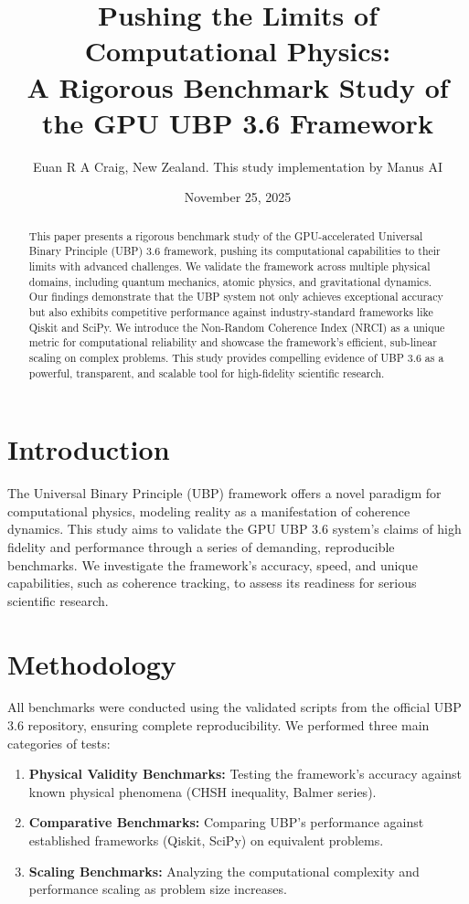 \documentclass[10pt, a4paper]{article}
\title{
    \textbf{Pushing the Limits of Computational Physics:}
    \\
    \large A Rigorous Benchmark Study of the GPU UBP 3.6 Framework
}
\author{Euan R A Craig, New Zealand. This study implementation by Manus AI}
\date{November 25, 2025}
\begin{document}
\maketitle

\begin{abstract}
This paper presents a rigorous benchmark study of the GPU-accelerated Universal Binary Principle (UBP) 3.6 framework, pushing its computational capabilities to their limits with advanced challenges. We validate the framework across multiple physical domains, including quantum mechanics, atomic physics, and gravitational dynamics. Our findings demonstrate that the UBP system not only achieves exceptional accuracy but also exhibits competitive performance against industry-standard frameworks like Qiskit and SciPy. We introduce the Non-Random Coherence Index (NRCI) as a unique metric for computational reliability and showcase the framework’s efficient, sub-linear scaling on complex problems. This study provides compelling evidence of UBP 3.6 as a powerful, transparent, and scalable tool for high-fidelity scientific research.
\end{abstract}

\section{Introduction}

The Universal Binary Principle (UBP) framework offers a novel paradigm for computational physics, modeling reality as a manifestation of coherence dynamics. This study aims to validate the GPU UBP 3.6 system’s claims of high fidelity and performance through a series of demanding, reproducible benchmarks. We investigate the framework’s accuracy, speed, and unique capabilities, such as coherence tracking, to assess its readiness for serious scientific research.

\section{Methodology}

All benchmarks were conducted using the validated scripts from the official UBP 3.6 repository, ensuring complete reproducibility. We performed three main categories of tests:

\begin{enumerate}
    \item \textbf{Physical Validity Benchmarks:} Testing the framework’s accuracy against known physical phenomena (CHSH inequality, Balmer series).
    \item \textbf{Comparative Benchmarks:} Comparing UBP’s performance against established frameworks (Qiskit, SciPy) on equivalent problems.
    \item \textbf{Scaling Benchmarks:} Analyzing the computational complexity and performance scaling as problem size increases.
\end{enumerate}
\end{document}
